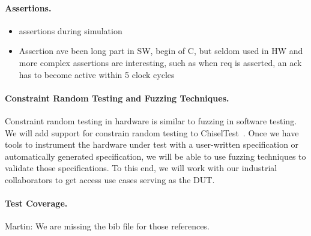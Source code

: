 \documentclass[conference]{IEEEtran}
\newcommand{\martin}[1]{{\color{blue} Martin: #1}}
\begin{document}
\paragraph{Assertions.}

\begin{itemize}
\item assertions during simulation
\item Assertion ave been long part in SW, begin of C, but seldom used in HW and more complex assertions are interesting, such as when req is asserted, an ack has to become active within 5 clock cycles
\end{itemize}

\paragraph{Constraint Random Testing and Fuzzing Techniques.}

Constraint random testing in hardware is similar to fuzzing in software testing.
We will add support for constrain random testing to ChiselTest~\cite{chisel:tester2}.
Once we have tools to instrument the hardware under test with a user-written
specification or automatically generated specification, we will be able to use fuzzing techniques
to validate those specifications. To this end, we will work
with our industrial collaborators to get access use cases serving
as the DUT.

\paragraph{Test Coverage.}

\martin{We are missing the bib file for those references.}
\end{document}
